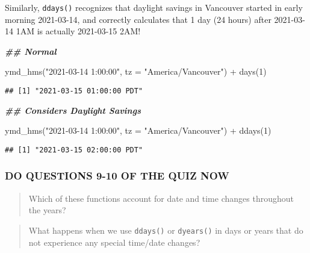 \documentclass[
]{book}
\newenvironment{Shaded}{\begin{snugshade}}{\end{snugshade}}
\newcommand{\AttributeTok}[1]{\textcolor[rgb]{0.77,0.63,0.00}{#1}}
\newcommand{\DecValTok}[1]{\textcolor[rgb]{0.00,0.00,0.81}{#1}}
\newcommand{\DocumentationTok}[1]{\textcolor[rgb]{0.56,0.35,0.01}{\textbf{\textit{#1}}}}
\newcommand{\FunctionTok}[1]{\textcolor[rgb]{0.00,0.00,0.00}{#1}}
\newcommand{\NormalTok}[1]{#1}
\newcommand{\SpecialCharTok}[1]{\textcolor[rgb]{0.00,0.00,0.00}{#1}}
\newcommand{\StringTok}[1]{\textcolor[rgb]{0.31,0.60,0.02}{#1}}
\begin{document}
Similarly, \texttt{ddays()} recognizes that daylight savings in Vancouver started in early morning 2021-03-14, and correctly calculates that 1 day (24 hours) after 2021-03-14 1AM is actually 2021-03-15 2AM!

\begin{Shaded}
\begin{Highlighting}[]
\DocumentationTok{\#\# Normal}

\FunctionTok{ymd\_hms}\NormalTok{(}\StringTok{"2021{-}03{-}14 1:00:00"}\NormalTok{, }
        \AttributeTok{tz =} \StringTok{"America/Vancouver"}\NormalTok{) }\SpecialCharTok{+}
    \FunctionTok{days}\NormalTok{(}\DecValTok{1}\NormalTok{)}
\end{Highlighting}
\end{Shaded}

\begin{verbatim}
## [1] "2021-03-15 01:00:00 PDT"
\end{verbatim}

\begin{Shaded}
\begin{Highlighting}[]
\DocumentationTok{\#\# Considers Daylight Savings}

\FunctionTok{ymd\_hms}\NormalTok{(}\StringTok{"2021{-}03{-}14 1:00:00"}\NormalTok{, }
        \AttributeTok{tz =} \StringTok{"America/Vancouver"}\NormalTok{) }\SpecialCharTok{+}
    \FunctionTok{ddays}\NormalTok{(}\DecValTok{1}\NormalTok{)}
\end{Highlighting}
\end{Shaded}

\begin{verbatim}
## [1] "2021-03-15 02:00:00 PDT"
\end{verbatim}

\hypertarget{do-questions-9-10-of-the-quiz-now}{%
\subsubsection{DO QUESTIONS 9-10 OF THE QUIZ NOW}\label{do-questions-9-10-of-the-quiz-now}}

\begin{quote}
Which of these functions account for date and time changes throughout the years?
\end{quote}

\begin{quote}
What happens when we use \texttt{ddays()} or \texttt{dyears()} in days or years that do not experience any special time/date changes?
\end{quote}
\end{document}
